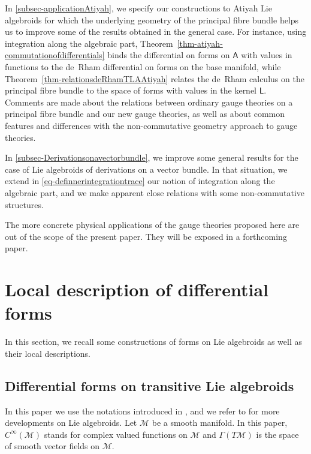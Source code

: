 \documentclass[number]{elsarticle}
\theoremstyle{definition}
\theoremstyle{remark}
\numberwithin{equation}{section}
\begin{document}
In \ref{subsec-applicationAtiyah}, we specify our constructions to Atiyah Lie algebroids for which the underlying geometry of the principal fibre bundle helps us to improve some of the results obtained in the general case. For instance, using integration along the algebraic part, Theorem~\ref{thm-atiyah-commutationofdifferentials} binds the differential on forms on ${{{{\mathbf{\mathsf{{A}}}}}}}$ with values in functions to the de~Rham differential on forms on the base manifold, while Theorem~\ref{thm-relationsdeRhamTLAAtiyah} relates the de~Rham calculus on the principal fibre bundle to the space of forms with values in the kernel ${{{{\mathbf{\mathsf{{L}}}}}}}$. Comments are made about the relations between ordinary gauge theories on a principal fibre bundle and our new gauge theories, as well as about common features and differences with the non-commutative geometry approach to gauge theories.

In \ref{subsec-Derivationsonavectorbundle}, we improve some general results for the case of Lie algebroids of derivations on a vector bundle. In that situation, we extend in \eqref{eq-definnerintegrationtrace} our notion of integration along the algebraic part, and we make apparent close relations with some non-commutative structures. 

The more concrete physical applications of the gauge theories proposed here are out of the scope of the present paper. They will be exposed in a forthcoming paper.

\section{Local description of differential forms}
\label{sec-localdescriptionforms}

In this section, we recall some constructions of forms on Lie algebroids as well as their local descriptions.

\subsection{Differential forms on transitive Lie algebroids}

In this paper we use the notations introduced in \cite{Mass38}, and we refer to \cite{Mack05a} for more developments on Lie algebroids. Let ${{{{\mathcal{{M}}}}}}$ be a smooth manifold. In this paper, $C^\infty({{{{\mathcal{{M}}}}}})$ stands for complex valued functions on ${{{{\mathcal{{M}}}}}}$ and $\Gamma(T{{{{\mathcal{{M}}}}}})$ is the space of smooth vector fields on ${{{{\mathcal{{M}}}}}}$.
\end{document}
